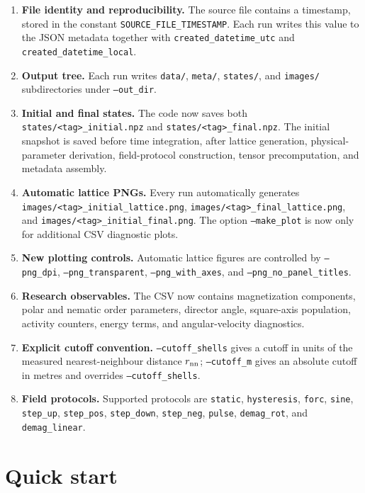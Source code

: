 \documentclass[11pt,a4paper]{article}
\newcommand{\code}[1]{\texttt{#1}}
\begin{document}
\begin{enumerate}[leftmargin=*]
    \item \textbf{File identity and reproducibility.} The source file contains a timestamp, stored in the constant \code{SOURCE\_FILE\_TIMESTAMP}. Each run writes this value to the JSON metadata together with \code{created\_datetime\_utc} and \code{created\_datetime\_local}.
    \item \textbf{Output tree.} Each run writes \code{data/}, \code{meta/}, \code{states/}, and \code{images/} subdirectories under \code{--out\_dir}.
    \item \textbf{Initial and final states.} The code now saves both \code{states/<tag>\_initial.npz} and \code{states/<tag>\_final.npz}. The initial snapshot is saved before time integration, after lattice generation, physical-parameter derivation, field-protocol construction, tensor precomputation, and metadata assembly.
    \item \textbf{Automatic lattice PNGs.} Every run automatically generates \code{images/<tag>\_initial\_lattice.png}, \code{images/<tag>\_final\_lattice.png}, and \code{images/<tag>\_initial\_final.png}. The option \code{--make\_plot} is now only for additional CSV diagnostic plots.
    \item \textbf{New plotting controls.} Automatic lattice figures are controlled by \code{--png\_dpi}, \code{--png\_transparent}, \code{--png\_with\_axes}, and \code{--png\_no\_panel\_titles}.
    \item \textbf{Research observables.} The CSV now contains magnetization components, polar and nematic order parameters, director angle, square-axis population, activity counters, energy terms, and angular-velocity diagnostics.
    \item \textbf{Explicit cutoff convention.} \code{--cutoff\_shells} gives a cutoff in units of the measured nearest-neighbour distance $r_{\rm nn}$; \code{--cutoff\_m} gives an absolute cutoff in metres and overrides \code{--cutoff\_shells}.
    \item \textbf{Field protocols.} Supported protocols are \code{static}, \code{hysteresis}, \code{forc}, \code{sine}, \code{step\_up}, \code{step\_pos}, \code{step\_down}, \code{step\_neg}, \code{pulse}, \code{demag\_rot}, and \code{demag\_linear}.
\end{enumerate}

\section{Quick start}
\label{sec:quickstart}
\end{document}
